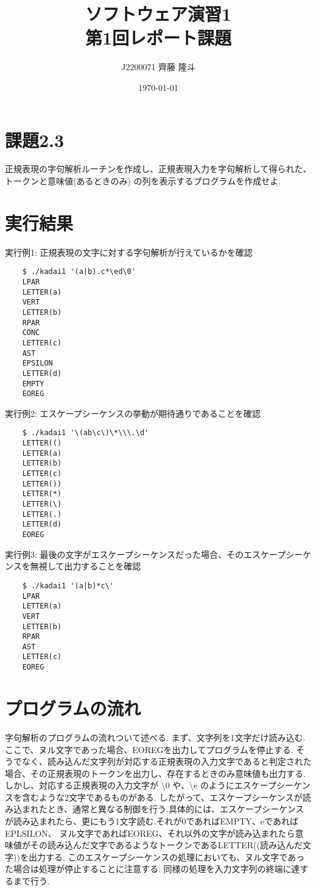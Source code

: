 \documentclass{jsarticle}
\title{ソフトウェア演習1 \\
第1回レポート課題}
\author{J2200071 齊藤 隆斗}
\date{\today}
\theoremstyle{plain}
\begin{document}
\maketitle


\section{課題2.3}
正規表現の字句解析ルーチンを作成し、正規表現入力を字句解析して得られた、トークンと意味値(あるときのみ)
の列を表示するプログラムを作成せよ.





\section{実行結果}

実行例1: 正規表現の文字に対する字句解析が行えているかを確認
\begin{lstlisting}
	$ ./kadai1 '(a|b).c*\ed\0'
	LPAR
	LETTER(a)
	VERT
	LETTER(b)
	RPAR
	CONC
	LETTER(c)
	AST
	EPSILON
	LETTER(d)
	EMPTY
	EOREG
\end{lstlisting}

実行例2: エスケープシーケンスの挙動が期待通りであることを確認
\begin{lstlisting}
	$ ./kadai1 '\(ab\c\)\*\\\.\d'
	LETTER(()
	LETTER(a)
	LETTER(b)
	LETTER(c)
	LETTER())
	LETTER(*)
	LETTER(\)
	LETTER(.)
	LETTER(d)
	EOREG
\end{lstlisting}

実行例3: 最後の文字がエスケープシーケンスだった場合、そのエスケープシーケンスを無視して出力することを確認
\begin{lstlisting}
	$ ./kadai1 '(a|b)*c\'
	LPAR
	LETTER(a)
	VERT
	LETTER(b)
	RPAR
	AST
	LETTER(c)
	EOREG
\end{lstlisting}



\section{プログラムの流れ}
字句解析のプログラムの流れついて述べる. まず、文字列を1文字だけ読み込む.ここで、ヌル文字であった場合、EOREGを出力してプログラムを停止する.
そうでなく、読み込んだ文字列が対応する正規表現の入力文字であると判定された場合、その正規表現のトークンを出力し、存在するときのみ意味値も出力する.
しかし、対応する正規表現の入力文字が \textbackslash 0 や、\textbackslash e のようにエスケープシーケンスを含むような2文字であるものがある.
したがって、エスケープシーケンスが読み込まれたとき、通常と異なる制御を行う.具体的には、エスケープシーケンスが読み込まれたら、更にもう1文字読む.それが0であればEMPTY、eであればEPLSILON、
ヌル文字であればEOREG、それ以外の文字が読み込まれたら意味値がその読み込んだ文字であるようなトークンであるLETTER((読み込んだ文字))を出力する.
このエスケープシーケンスの処理においても、ヌル文字であった場合は処理が停止することに注意する.
同様の処理を入力文字列の終端に達するまで行う.
\end{document}
